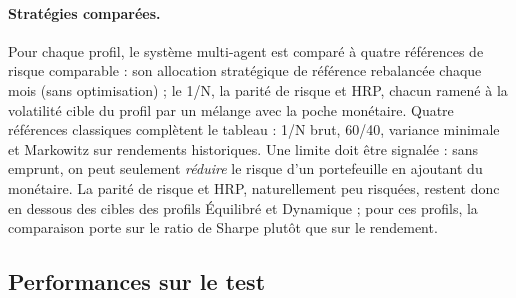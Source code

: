 \paragraph{Stratégies comparées.} Pour chaque profil, le système multi-agent est comparé à quatre références de risque comparable : son allocation stratégique de référence rebalancée chaque mois (sans optimisation) ; le 1/N, la parité de risque et HRP, chacun ramené à la volatilité cible du profil par un mélange avec la poche monétaire. Quatre références classiques complètent le tableau : 1/N brut, 60/40, variance minimale et Markowitz sur rendements historiques. Une limite doit être signalée : sans emprunt, on peut seulement \emph{réduire} le risque d'un portefeuille en ajoutant du monétaire. La parité de risque et HRP, naturellement peu risquées, restent donc en dessous des cibles des profils Équilibré et Dynamique ; pour ces profils, la comparaison porte sur le ratio de Sharpe plutôt que sur le rendement.

\subsection{Performances sur le test}

